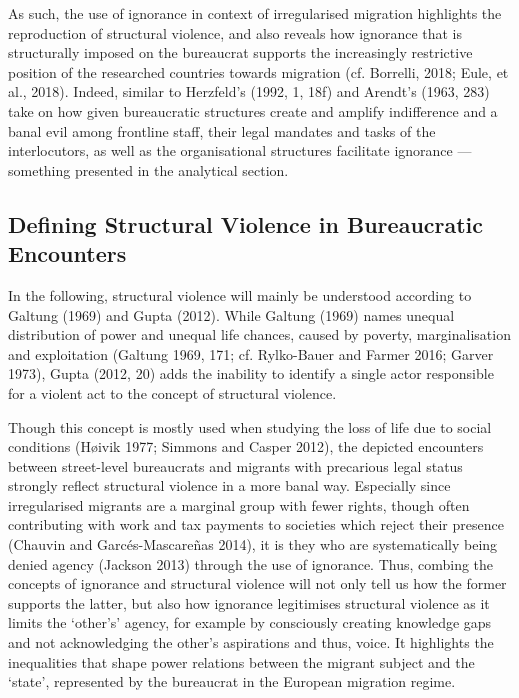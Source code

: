 \par
As such, the use of ignorance in context of irregularised migration highlights the reproduction of structural violence, and also reveals how ignorance that is structurally imposed on the bureaucrat supports the increasingly restrictive position of the researched countries towards migration (cf. Borrelli, 2018; Eule, et al., 2018). Indeed, similar to Herzfeld’s (1992, 1, 18f) and Arendt’s (1963, 283) take on how given bureaucratic structures create and amplify indifference and a banal evil among frontline staff, their legal mandates and tasks of the interlocutors, as well as the organisational structures facilitate ignorance ---something presented in the analytical section.        

\subsection{Defining Structural Violence in Bureaucratic Encounters}
In the following, structural violence will mainly be understood according to Galtung (1969) and Gupta (2012). While Galtung (1969) names unequal distribution of power and unequal life chances, caused by poverty, marginalisation and exploitation (Galtung 1969, 171; cf. Rylko-Bauer and Farmer 2016; Garver 1973), Gupta (2012, 20) adds the inability to identify a single actor responsible for a violent act to the concept of structural violence.
\par
Though this concept is mostly used when studying the loss of life due to social conditions (Høivik 1977; Simmons and Casper 2012), the depicted encounters between street-level bureaucrats and migrants with precarious legal status strongly reflect structural violence in a more banal way. Especially since irregularised migrants are a marginal group with fewer rights, though often contributing with work and tax payments to societies which reject their presence (Chauvin and Garcés-Mascareñas 2014), it is they who are systematically being denied agency (Jackson 2013) through the use of ignorance. Thus, combing the concepts of ignorance and structural violence will not only tell us how the former supports the latter, but also how ignorance legitimises structural violence as it limits the ‘other’s’ agency,  for example by consciously creating knowledge gaps and not acknowledging the other’s aspirations and thus, voice.  It highlights the inequalities that shape power relations between the migrant subject and the ‘state’, represented by the bureaucrat in the European migration regime. 

